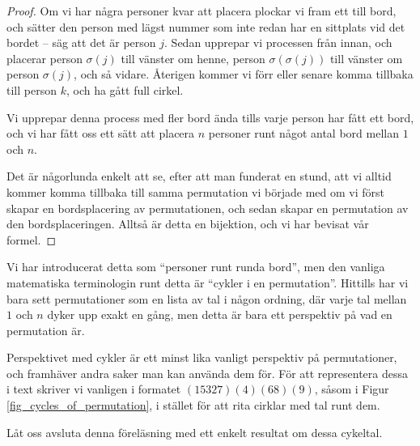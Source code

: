 \documentclass[nobib]{tufte-handout}
\begin{document}
\begin{theorem}
\begin{proof}
    Om vi har några personer kvar att placera plockar vi fram ett till bord, och sätter den person med lägst nummer som inte redan har en sittplats vid det bordet -- säg att det är person $j$. Sedan upprepar vi processen från innan, och placerar person $\sigma(j)$ till vänster om henne, person $\sigma(\sigma(j))$ till vänster om person $\sigma(j)$, och så vidare. Återigen kommer vi förr eller senare komma tillbaka till person $k$, och ha gått full cirkel.

    Vi upprepar denna process med fler bord ända tills varje person har fått ett bord, och vi har fått oss ett sätt att placera $n$ personer runt något antal bord mellan $1$ och $n$.

    Det är någorlunda enkelt att se, efter att man funderat en stund, att vi alltid kommer komma tillbaka till samma permutation vi började med om vi först skapar en bordsplacering av permutationen, och sedan skapar en permutation av den bordsplaceringen. Alltså är detta en bijektion, och vi har bevisat vår formel.
  \end{proof}
\end{theorem}

\begin{remark}
  Vi har introducerat detta som ``personer runt runda bord'', men den vanliga matematiska terminologin runt detta är ``cykler i en permutation''. Hittills har vi bara sett permutationer som en lista av tal i någon ordning, där varje tal mellan $1$ och $n$ dyker upp exakt en gång, men detta är bara ett perspektiv på vad en permutation är.

  Perspektivet med cykler är ett minst lika vanligt perspektiv på permutationer, och framhäver andra saker man kan använda dem för. För att representera dessa i text skriver vi vanligen i formatet $(15327)(4)(68)(9)$, såsom i Figur \ref{fig_cycles_of_permutation}, i stället för att rita cirklar med tal runt dem.
\end{remark}

Låt oss avsluta denna föreläsning med ett enkelt resultat om dessa cykeltal.
\end{document}
